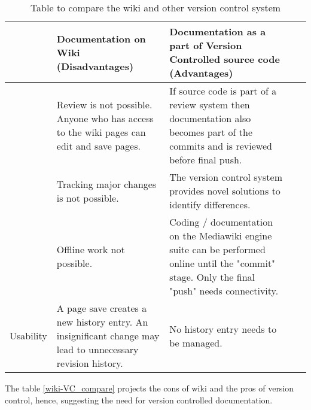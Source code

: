 \begin{table}[]
\centering
\caption{Table to compare the wiki and other version control system}
\label{wiki-VC_compare}
\begin{tabular}{|l|l|l|ll}
\hline
{\bf }                                                                                            & \cellcolor[HTML]{FFFC9E}Documentation on Wiki (Disadvantages)                                              & \cellcolor[HTML]{FFFFC7}Documentation as a part of Version Controlled source code (Advantages)                                                   &  &  \\ \hline
\multicolumn{1}{|c|}{\cellcolor[HTML]{FFFFC7}{\color[HTML]{333333} }}                             & Review is not possible. Anyone who has access to the wiki pages can edit and save pages.                   & If source code is part of a review system then documentation also becomes part of the commits and is reviewed before final push.                 &  &  \\ \cline{2-5} 
\multicolumn{1}{|c|}{\multirow{-2}{*}{\cellcolor[HTML]{FFFFC7}{\color[HTML]{333333} Maintenace}}} & Tracking major changes is not possible.                                                                    & The version control system provides novel solutions to identify differences.                                                                     &  &  \\ \hline
\cellcolor[HTML]{FFFC9E}                                                                          & Offline work not possible.                                                                                 & Coding / documentation on the Mediawiki engine suite can be performed online until the "commit" stage. Only the final "push" needs connectivity. &  &  \\ \cline{2-5} 
\multirow{-2}{*}{\cellcolor[HTML]{FFFC9E}Usability}                                               & A page save creates a new history entry. An insignificant change may lead to unnecessary revision history. & No history entry needs to be managed.                                                                                                            &  &  \\ \hline
\end{tabular}
\end{table}


The table \autoref{wiki-VC_compare} projects the cons of wiki and the pros of version control, hence, suggesting the need for version controlled documentation. 

